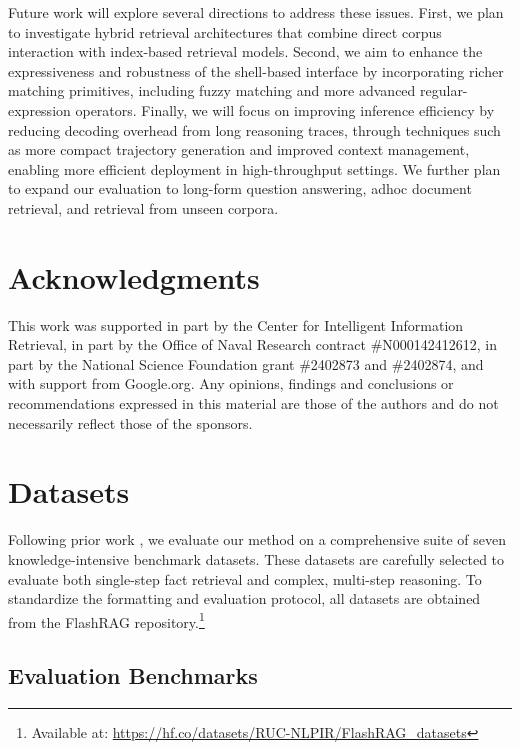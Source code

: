 \documentclass{article} %
\begin{document}
Future work will explore several directions to address these issues. First, we plan to investigate hybrid retrieval architectures that combine direct corpus interaction with index-based retrieval models. Second, we aim to enhance the expressiveness and robustness of the shell-based interface by incorporating richer matching primitives, including fuzzy matching and more advanced regular-expression operators. Finally, we will focus on improving inference efficiency by reducing decoding overhead from long reasoning traces, through techniques such as more compact trajectory generation and improved context management, enabling more efficient deployment in high-throughput settings. We further plan to expand our evaluation to long-form question answering, adhoc document retrieval, and retrieval from unseen corpora.

\section*{Acknowledgments}
This work was supported in part by the Center for Intelligent Information Retrieval, in part by the Office of Naval Research contract \#N000142412612, in part by the National Science Foundation grant \#2402873 and \#2402874, and with support from Google.org. Any opinions, findings and conclusions or recommendations expressed in this material are those of the authors and do not necessarily reflect those of the sponsors.

\newpage



\appendix

\newpage
\section{Datasets}
\label{app:dataset}


Following prior work \citep{search-r1}, we evaluate our method on a comprehensive suite of seven knowledge-intensive benchmark datasets. These datasets are carefully selected to evaluate both single-step fact retrieval and complex, multi-step reasoning. To standardize the formatting and evaluation protocol, all datasets are obtained from the FlashRAG repository.\footnote{Available at: \url{https://hf.co/datasets/RUC-NLPIR/FlashRAG_datasets}}

\subsection{Evaluation Benchmarks}
\end{document}
